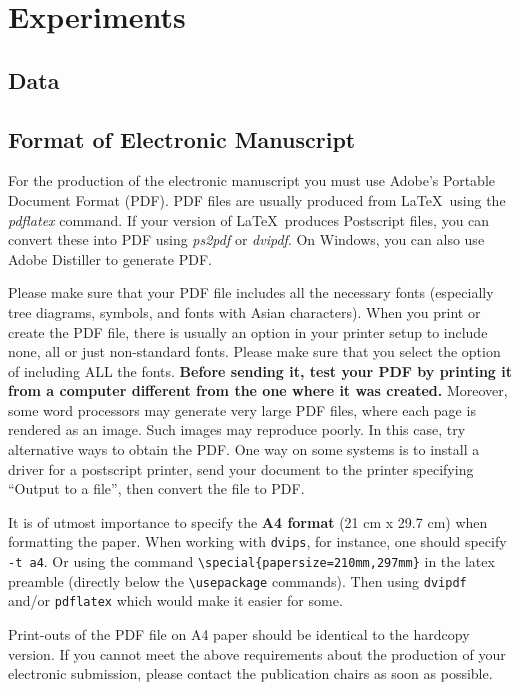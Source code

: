 \documentclass[11pt,a4paper]{article}
\begin{document}
\section{Experiments}

\subsection{Data}

\subsection{Format of Electronic Manuscript}
\label{sect:pdf}

For the production of the electronic manuscript you must use Adobe's
Portable Document Format (PDF). PDF files are usually produced from
\LaTeX\ using the \textit{pdflatex} command. If your version of
\LaTeX\ produces Postscript files, you can convert these into PDF
using \textit{ps2pdf} or \textit{dvipdf}. On Windows, you can also use
Adobe Distiller to generate PDF.

Please make sure that your PDF file includes all the necessary fonts
(especially tree diagrams, symbols, and fonts with Asian
characters). When you print or create the PDF file, there is usually
an option in your printer setup to include none, all or just
non-standard fonts.  Please make sure that you select the option of
including ALL the fonts. \textbf{Before sending it, test your PDF by
  printing it from a computer different from the one where it was
  created.} Moreover, some word processors may generate very large PDF
files, where each page is rendered as an image. Such images may
reproduce poorly. In this case, try alternative ways to obtain the
PDF. One way on some systems is to install a driver for a postscript
printer, send your document to the printer specifying ``Output to a
file'', then convert the file to PDF.

It is of utmost importance to specify the \textbf{A4 format} (21 cm
x 29.7 cm) when formatting the paper. When working with
{\tt dvips}, for instance, one should specify {\tt -t a4}.
Or using the command \verb|\special{papersize=210mm,297mm}| in the latex
preamble (directly below the \verb|\usepackage| commands). Then using 
{\tt dvipdf} and/or {\tt pdflatex} which would make it easier for some.

Print-outs of the PDF file on A4 paper should be identical to the
hardcopy version. If you cannot meet the above requirements about the
production of your electronic submission, please contact the
publication chairs as soon as possible.
\end{document}
